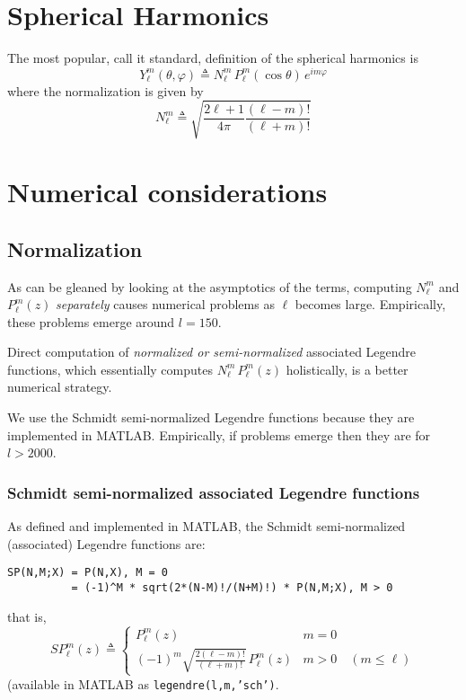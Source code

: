 \documentclass[a4paper,10pt]{article}
\newcommand{\dfn}{\triangleq}
\begin{document}
\section{Spherical Harmonics}

The most popular, call it standard, definition of the spherical harmonics is
\[
	Y_{\ell}^{m}(\theta,\varphi)\dfn
		N_{\ell}^{m}\,
		P_{\ell}^{m}(\cos\theta)\,
		e^{i m\varphi}
\]
where the normalization is given by
\[
	N_{\ell}^{m}\dfn\sqrt{\frac{2\ell+1}{4\pi}\frac{(\ell-m)!}{(\ell+m)!}}
\]

\section{Numerical considerations}

\subsection{Normalization}

As can be gleaned by looking at the asymptotics of the terms, computing $N_{\ell}^{m}$ and $P_{\ell}^{m}(z)$ \emph{separately} causes numerical problems as $\ell$ becomes large. Empirically, these problems emerge around $l=150$.

Direct computation of \emph{normalized or semi-normalized} associated Legendre functions, which essentially computes $N_{\ell}^{m}\,P_{\ell}^{m}(z)$ holistically, is a better numerical strategy.

We use the Schmidt semi-normalized Legendre functions because they are implemented in MATLAB. Empirically, if problems emerge then they are for $l>2000$.

\subsubsection{Schmidt semi-normalized associated Legendre functions}

As defined and implemented in MATLAB, the Schmidt semi-normalized (associated) Legendre functions are:
\color{blue}\begin{verbatim}
SP(N,M;X) = P(N,X), M = 0
          = (-1)^M * sqrt(2*(N-M)!/(N+M)!) * P(N,M;X), M > 0
\end{verbatim}\color{black}
that is,
\[
	S\!P_{\ell}^{m}(z)\dfn
		\begin{cases}
			\displaystyle
			P_{\ell}^{m}(z) &m=0 \\
			\displaystyle
			(-1)^{m}\sqrt{\frac{2(\ell-m)!}{(\ell+m)!}}\,
			P_{\ell}^{m}(z) &m>0\quad (m\leq\ell)
		\end{cases}
\]
(available in MATLAB as {\tt\color{blue}legendre(l,m,'sch')}.
\end{document}
